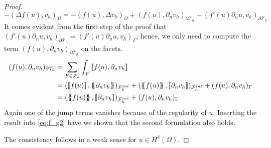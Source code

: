 \begin{proof}
\begin{equation}
\label{eq:f_g2}
-(\Delta f( u) , v_{h})_{\Omega  }  = -( f( u), \Delta v_{h} )_{\Omega } + (f( u), \partial _{n} v_{h}  )_{\partial \mathcal{T}_{h} } - (   f'( u)\partial _{n}u, v_{h} )_{\partial \mathcal{T}_{h}  }
\end{equation}
It comes evident from the first step of the proof that $ (   f'( u)\partial _{n}u, v_{h} )_{\partial \mathcal{T}_{h}  } = (   f'( u)\partial _{n}u, v_{h} )_{\Gamma }$, hence, we only need to compute the term $(f( u), \partial _{n} v_{h}  )_{\partial
\mathcal{T}_{h} }$ on the facets. \[
    \begin{split}
(f( u), \partial _{n} v_{h}  )_{\partial
\mathcal{T}_{h} } & = \sum_{F\in \mathcal{F} _{h}}^{} \int_{F}^{}\jump{ f( u), \partial _{n} v_{h}  } \\
& =  (\jump{ f( u)  }  , \mean{ \partial _{n} v_{h} }    )_{ \mathcal{F}_{h}^{int} } +(\mean{ f( u)  }  , \jump{ \partial _{n} v_{h} }    )_{ \mathcal{F}_{h}^{int} } + (f( u), \partial _{n} v_{h}  )_{\Gamma } \\
&=  (\mean{ f( u)  }  , \jump{ \partial _{n} v_{h} }    )_{ \mathcal{F}_{h}^{int} } + (f( u), \partial _{n} v_{h}  )_{\Gamma }
    \end{split}
\]
Again one of the jump terms vanishes because of the regularity of $u$.
Inserting the result into \eqref{eq:f_g2} have we shown that the second formulation also holds.

The consistency follows in a weak sense for $u \in H^{4}( \Omega ) $.
\end{proof}

